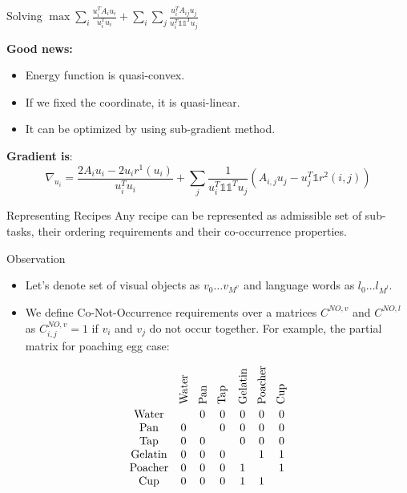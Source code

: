 \begin{frame}{\vspace{-8mm}\\ Solving $\max \sum_{i} \frac{u_i^TA_iu_i}{u_i^Tu_i} + \sum_{i}\sum_{j} \frac{u_i^TA_{ij}u_j}{u_i^T \mathds{1} \mathds{1}^Tu_j}$}

{\bf Good news:}
\begin{itemize}
\item Energy function is quasi-convex.
\item If we fixed the coordinate, it is quasi-linear.
\item It can be optimized by using sub-gradient method.
\end{itemize}

{\bf Gradient is}: \\
\[
\nabla_{u_i} = \frac{2A_i u_i -2u_ir^1(u_i)}{u_i^Tu_i} + \sum_j \frac{1}{u_i^T \mathds{1} \mathds{1}^T u_j} \left( A_{i,j}u_j - u_j^T \mathds{1} r^2(i,j) \right)
\]

\end{frame}



\begin{frame}{Representing Recipes}
Any recipe can be represented as admissible set of sub-tasks, their ordering requirements and their co-occurrence properties.
\end{frame}


\begin{frame}{Observation}
\begin{itemize}
\item Let's denote set of visual objects as $v_0 \ldots v_{M^v}$ and language words as $l_0 \ldots l_{M^l}$.
\item We define Co-Not-Occurrence requirements over a matrices $C^{NO,v}$ and $C^{NO,l}$ as $C^{NO,v}_{i,j} =1$ if $v_i$ and $v_j$ do not occur together. For example, the partial matrix for poaching egg case:
\end{itemize}
\[
 \begin{array}{ccccccc}
&\rotatebox{90}{Water} & \rotatebox{90}{Pan} & \rotatebox{90}{Tap} & \rotatebox{90}{Gelatin} & \rotatebox{90}{Poacher} & \rotatebox{90}{Cup} \\
\text{Water} &  & 0 & 0 & 0 & 0 & 0 \\
\text{Pan} & 0 &  & 0 & 0 & 0 & 0 \\
\text{Tap} & 0 & 0 &  & 0 & 0 & 0 \\
\text{Gelatin} & 0 & 0 & 0 &  & 1 & 1 \\
\text{Poacher} & 0 & 0 & 0 & 1 &  & 1 \\
\text{Cup} & 0 & 0 & 0 & 1 & 1 &
\end{array}
\]
\end{frame}

